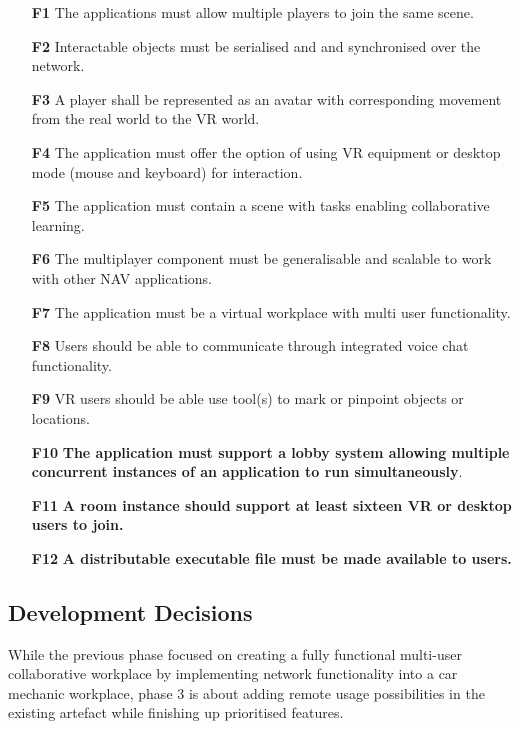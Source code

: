 \begin{enumerate}
  \setlength\itemsep{0em}
    \item [\textbf{F1}] The applications must allow multiple players to join the same scene.
    \item [\textbf{F2}] Interactable objects must be serialised and and synchronised over the network.
    \item [\textbf{F3}] A player shall be represented as an avatar with corresponding movement from the real world to the VR world.
    \item [\textbf{F4}] The application must offer the option of using VR equipment or desktop mode (mouse and keyboard) for interaction.
    \item [\textbf{F5}] The application must contain a scene with tasks enabling collaborative learning.
    \item [\textbf{F6}] The multiplayer component must be generalisable and scalable to work with other NAV applications.
    \item [\textbf{F7}] The application must be a virtual workplace with multi user functionality.
    \item [\textbf{F8}] Users should be able to communicate through integrated voice chat functionality.
    \item [\textbf{F9}] VR users should be able use tool(s) to mark or pinpoint objects or locations.
    \item [\textbf{F10}] \textbf{The application must support a lobby system allowing multiple concurrent instances of an application to run simultaneously}.
    \item [\textbf{F11}] \textbf{A room instance should support at least sixteen VR or desktop users to join.}
    \item [\textbf{F12}] \textbf{A distributable executable file must be made available to users.}
\end{enumerate}




\subsection{Development Decisions}
While the previous phase focused on creating a fully functional multi-user collaborative workplace by implementing network functionality into a car mechanic workplace, phase 3 is about adding remote usage possibilities in the existing artefact while finishing up prioritised features.  


